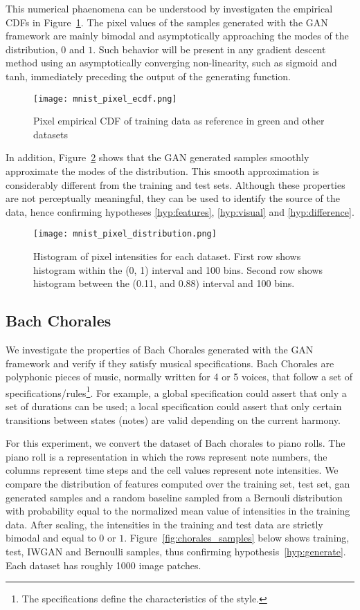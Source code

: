 This numerical phaenomena can be understood by investigaten the empirical CDFs 
in Figure~\ref{fig:mnist_pixel_ecdf}. The pixel values of the samples
generated with the GAN framework are mainly bimodal and asymptotically
approaching the modes of the distribution, $0$ and $1$. Such behavior will be
present in any gradient descent method using an asymptotically converging 
non-linearity, such as sigmoid and tanh, immediately preceding the output of 
the generating function.

\begin{figure}[!h]
  \texttt{[image: mnist\_pixel\_ecdf.png]}
    \caption{Pixel empirical CDF of training data as reference in green and other datasets}
  \label{fig:mnist_pixel_ecdf}
\end{figure}

In addition, Figure~\ref{fig:mnist_pixel_distribution} shows that the GAN
generated samples smoothly approximate the modes of the distribution. This
smooth approximation is considerably different from the training and test sets.
Although these properties are not perceptually meaningful, they can be used to 
identify the source of the data, hence confirming hypotheses \ref{hyp:features}, 
\ref{hyp:visual} and \ref{hyp:difference}.

\begin{figure}[!h]
  \texttt{[image: mnist\_pixel\_distribution.png]}
  \caption{Histogram of pixel intensities for each dataset. First row shows
    histogram within the (0, 1) interval and 100 bins. Second row shows histogram
    between the (0.11, and 0.88) interval and 100 bins.}
  \label{fig:mnist_pixel_distribution}
\end{figure}

\subsection{Bach Chorales}
We investigate the properties of Bach Chorales generated with the GAN framework
and verify if they satisfy musical specifications.
Bach Chorales are polyphonic pieces of music, normally
written for 4 or 5 voices, that follow a set of
specifications/rules\footnote{The specifications define the characteristics of the 
style.}. For example, a global specification could assert that only a set of
durations can be used; a local specification could assert that only certain
transitions between states (notes) are valid depending on the current harmony.

For this experiment, we convert the dataset of Bach chorales to piano rolls. The
piano roll is a representation in which the rows represent note numbers, the columns
represent time steps and the cell values represent note intensities. We compare
the distribution of features computed over the training set, test set, gan
generated samples and a random baseline sampled from a Bernouli distribution with 
probability equal to the normalized mean value of intensities in the
training data. After scaling, the intensities in the training and test data are
strictly bimodal and equal to $0$ or $1$. Figure~\ref{fig:chorales_samples} below
shows training, test, IWGAN and Bernoulli samples, thus confirming
hypothesis~\ref{hyp:generate}. Each dataset has roughly 1000 image patches.

